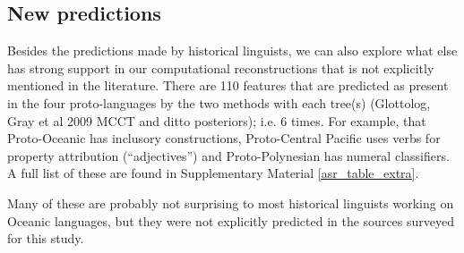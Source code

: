 \documentclass[a4paper,10pt]{article} %
\begin{document}
%
%

\subsection{New predictions}
Besides the predictions made by historical linguists, we can also explore what else has strong support in our computational reconstructions that is not explicitly mentioned in the literature. There are 110 features that are predicted as present in the four proto-languages by the two methods with each tree(s) (Glottolog, Gray et al 2009 MCCT and ditto posteriors); i.e. 6 times. For example, that Proto-Oceanic has inclusory constructions, Proto-Central Pacific uses verbs for property attribution (``adjectives'') and Proto-Polynesian has numeral classifiers.  A full list of these are found in Supplementary Material \ref{asr_table_extra}.

Many of these are probably not surprising to most historical linguists working on Oceanic languages, but they were not explicitly predicted in the sources surveyed for this study.

\end{document}
